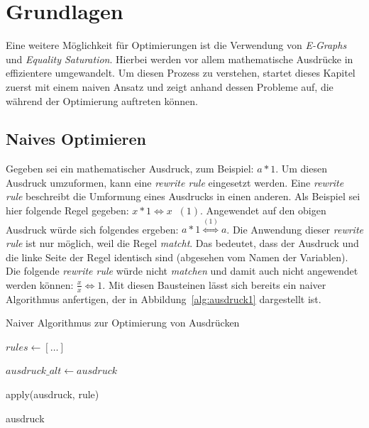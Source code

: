 \section{Grundlagen}\label{sec:grundlagen}


\noindent Eine weitere Möglichkeit für Optimierungen ist die Verwendung von \textit{E-Graphs} und \textit{Equality Saturation}.
Hierbei werden vor allem mathematische Ausdrücke in effizientere umgewandelt.
Um diesen Prozess zu verstehen, startet dieses Kapitel zuerst mit einem naiven Ansatz und zeigt anhand dessen Probleme auf, die
während der Optimierung auftreten können.

\subsection{Naives Optimieren}

Gegeben sei ein mathematischer Ausdruck, zum Beispiel: $a * 1$. Um diesen Ausdruck umzuformen, kann eine \textit{rewrite rule} eingesetzt werden.
Eine \textit{rewrite rule} beschreibt die Umformung eines Ausdrucks in einen anderen. Als Beispiel sei hier folgende Regel gegeben: $x * 1 \Leftrightarrow x \;\; (1)$.
Angewendet auf den obigen Ausdruck würde sich folgendes ergeben: $a * 1  \overset{(1)}{\Leftrightarrow} a$.
Die Anwendung dieser \textit{rewrite rule} ist nur möglich, weil die Regel \textit{matcht}. Das bedeutet, dass der Ausdruck und die linke Seite der Regel identisch sind 
(abgesehen vom Namen der Variablen). Die folgende \textit{rewrite rule} würde nicht \textit{matchen} und damit auch nicht angewendet werden können: $\frac{x}{x} \Leftrightarrow 1$.
Mit diesen Bausteinen lässt sich bereits ein naiver Algorithmus anfertigen, der in Abbildung~\ref{alg:ausdruck1} dargestellt ist.

\begin{algorithm}[H]
  \caption{Naiver Algorithmus zur Optimierung von Ausdrücken}\label{alg:ausdruck1}
  \begin{algorithmic}
    \State $rules \gets [\ldots]$
    
      \State $ausdruck\_alt \gets ausdruck$

        \State apply(ausdruck, rule)
        \EndIf
      \EndFor
    \EndWhile

    \State \Return ausdruck
    \EndFunction
  \end{algorithmic}
\end{algorithm}

